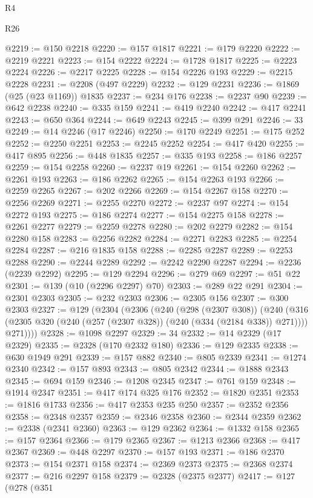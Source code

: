 \begin{lexlean}{R4}
\begin{lexlean}{R26}
\begin{coremodule}
{{{{{{{{{{{{{{{{{{{{{{{{{{{{{{{{{{{{{{{{{{{{{{{{{{{{{{{{{{{{{{{{{{{{{{{{@2219 := @150 @2218
@2220 := @157 @1817
@2221 := @179 @2220
@2222 := @2219 @2221
@2223 := @154 @2222
@2224 := @1728 @1817
@2225 := @2223 @2224
@2226 := @2217 @2225
@2228 := @154 @2226 @193
@2229 := @2215 @2228
@2231 := @2208 (@497 @2229)
@2232 := @129 @2231
@2236 := @1869 (@25 (@23 @1169)) @1835
@2237 := @234 @176
@2238 := @2237 @90
@2239 := @642 @2238
@2240 := @335 @159
@2241 := @419 @2240
@2242 := @417 @2241
@2243 := @650 @364
@2244 := @649 @2243
@2245 := @399 @291
@2246 := 33
@2249 := @14 @2246 (@17 @2246)
@2250 := @170 @2249
@2251 := @175 @252
@2252 := @2250 @2251
@2253 := @2245 @2252
@2254 := @417 @420
@2255 := @417 @895
@2256 := @448 @1835
@2257 := @335 @193
@2258 := @186 @2257
@2259 := @154 @2258
@2260 := @2237 @19
@2261 := @154 @2260
@2262 := @2261 @193
@2263 := @186 @2262
@2265 := @154 @2263 @193
@2266 := @2259 @2265
@2267 := @202 @2266
@2269 := @154 @2267 @158
@2270 := @2256 @2269
@2271 := @2255 @2270
@2272 := @2237 @97
@2274 := @154 @2272 @193
@2275 := @186 @2274
@2277 := @154 @2275 @158
@2278 := @2261 @2277
@2279 := @2259 @2278
@2280 := @202 @2279
@2282 := @154 @2280 @158
@2283 := @2256 @2282
@2284 := @2271 @2283
@2285 := @2254 @2284
@2287 := @216 @1835 @158
@2288 := @2285 @2287
@2289 := @2253 @2288
@2290 := @2244 @2289
@2292 := @2242 @2290 @2287
@2294 := @2236 (@2239 @2292)
@2295 := @129 @2294
@2296 := @279 @69
@2297 := @51 @22
@2301 := @139 (@10 (@2296 @2297) @70)
@2303 := @289 @22 @291
@2304 := @2301 @2303
@2305 := @232 @2303
@2306 := @2305 @156
@2307 := @300 @2303
@2327 := @129
    (@2304
      (@2306
        (@240
          (@298 (@2307 @308))
          (@240
            (@316 (@2305 @320 (@240 (@257 (@2307 @328)) (@240 (@334 (@2184 @338)) @271))))
            @271))))
@2328 := @1098 @2297
@2329 := 34
@2332 := @14 @2329 (@17 @2329)
@2335 := @2328 (@170 @2332 @180)
@2336 := @129 @2335
@2338 := @630 @1949 @291
@2339 := @157 @882
@2340 := @805 @2339
@2341 := @1274 @2340
@2342 := @157 @893
@2343 := @805 @2342
@2344 := @1888 @2343
@2345 := @694 @159
@2346 := @1208 @2345
@2347 := @761 @159
@2348 := @1914 @2347
@2351 := @417 @174 @325 @176
@2352 := @1820 @2351
@2353 := @1816 @1733
@2356 := @417 @2353 @235 @250
@2357 := @2352 @2356
@2358 := @2348 @2357
@2359 := @2346 @2358
@2360 := @2344 @2359
@2362 := @2338 (@2341 @2360)
@2363 := @129 @2362
@2364 := @1332 @158
@2365 := @157 @2364
@2366 := @179 @2365
@2367 := @1213 @2366
@2368 := @417 @2367
@2369 := @448 @2297
@2370 := @157 @193
@2371 := @186 @2370
@2373 := @154 @2371 @158
@2374 := @2369 @2373
@2375 := @2368 @2374
@2377 := @216 @2297 @158
@2379 := @2328 (@2375 @2377)
@2417 := @127
    (@278
      (@351
}}}}}}}}}}}}}}}}}}}}}}}}}}}}}}}}}}}}}}}}}}}}}}}}}}}}}}}}}}}}}}}}}}}}}}}}
\end{coremodule}
\end{lexlean}
\end{lexlean}
